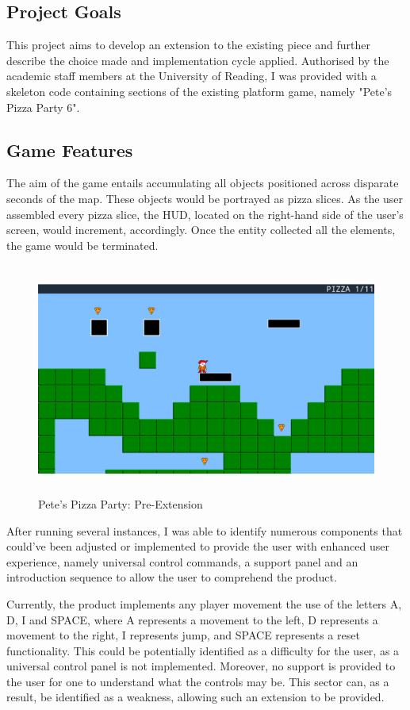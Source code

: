 \documentclass{article}
\begin{document}
\subsection{Project Goals}
This project aims to develop an extension to the existing piece and further describe the choice made and implementation cycle applied. Authorised by the academic staff members at the University of Reading, I was provided with a skeleton code containing sections of the existing platform game, namely "Pete's Pizza Party 6".

\subsection{Game Features}
The aim of the game entails accumulating all objects positioned across disparate seconds of the map. These objects would be portrayed as pizza slices. As the user assembled every pizza slice, the HUD, located on the right-hand side of the user's screen, would increment, accordingly. Once the entity collected all the elements, the game would be terminated.
\begin{figure}[H]
    \centering
    \includegraphics[height=3in]{figure1.png}
    \caption[Pete's Pizza Party: Pre-Extension]{Pete's Pizza Party: Pre-Extension}
    \label{fig:pete's pizza party}
\end{figure}
After running several instances, I was able to identify numerous components that could've been adjusted or implemented to provide the user with enhanced user experience, namely universal control commands, a support panel and an introduction sequence to allow the user to comprehend the product.

Currently, the product implements any player movement the use of the letters A, D, I and SPACE, where A represents a movement to the left, D represents a movement to the right, I represents jump, and SPACE represents a reset functionality. This could be potentially identified as a difficulty for the user, as a universal control panel is not implemented. Moreover, no support is provided to the user for one to understand what the controls may be. This sector can, as a result, be identified as a weakness, allowing such an extension to be provided.
\end{document}
